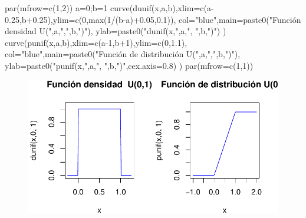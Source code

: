 \documentclass[
  letterpaper,
  DIV=11,
  numbers=noendperiod]{scrreprt}
\newenvironment{Shaded}{\begin{snugshade}}{\end{snugshade}}
\newcommand{\AttributeTok}[1]{\textcolor[rgb]{0.40,0.45,0.13}{#1}}
\newcommand{\DecValTok}[1]{\textcolor[rgb]{0.68,0.00,0.00}{#1}}
\newcommand{\FloatTok}[1]{\textcolor[rgb]{0.68,0.00,0.00}{#1}}
\newcommand{\FunctionTok}[1]{\textcolor[rgb]{0.28,0.35,0.67}{#1}}
\newcommand{\NormalTok}[1]{\textcolor[rgb]{0.00,0.23,0.31}{#1}}
\newcommand{\OtherTok}[1]{\textcolor[rgb]{0.00,0.23,0.31}{#1}}
\newcommand{\SpecialCharTok}[1]{\textcolor[rgb]{0.37,0.37,0.37}{#1}}
\newcommand{\StringTok}[1]{\textcolor[rgb]{0.13,0.47,0.30}{#1}}
\begin{document}
\begin{Shaded}
\begin{Highlighting}[]
\FunctionTok{par}\NormalTok{(}\AttributeTok{mfrow=}\FunctionTok{c}\NormalTok{(}\DecValTok{1}\NormalTok{,}\DecValTok{2}\NormalTok{))}
\NormalTok{a}\OtherTok{=}\DecValTok{0}\NormalTok{;b}\OtherTok{=}\DecValTok{1}
\FunctionTok{curve}\NormalTok{(}\FunctionTok{dunif}\NormalTok{(x,a,b),}\AttributeTok{xlim=}\FunctionTok{c}\NormalTok{(a}\FloatTok{{-}0.25}\NormalTok{,b}\FloatTok{+0.25}\NormalTok{),}\AttributeTok{ylim=}\FunctionTok{c}\NormalTok{(}\DecValTok{0}\NormalTok{,}\FunctionTok{max}\NormalTok{(}\DecValTok{1}\SpecialCharTok{/}\NormalTok{(b}\SpecialCharTok{{-}}\NormalTok{a)}\SpecialCharTok{+}\FloatTok{0.05}\NormalTok{,}\FloatTok{0.1}\NormalTok{)),}
      \AttributeTok{col=}\StringTok{"blue"}\NormalTok{,}\AttributeTok{main=}\FunctionTok{paste0}\NormalTok{(}\StringTok{"Función densidad  U("}\NormalTok{,a,}\StringTok{","}\NormalTok{,b,}\StringTok{")"}\NormalTok{),}
      \AttributeTok{ylab=}\FunctionTok{paste0}\NormalTok{(}\StringTok{"dunif(x,"}\NormalTok{,a,}\StringTok{", "}\NormalTok{,b,}\StringTok{")"}\NormalTok{)}
\NormalTok{      )}
\FunctionTok{curve}\NormalTok{(}\FunctionTok{punif}\NormalTok{(x,a,b),}\AttributeTok{xlim=}\FunctionTok{c}\NormalTok{(a}\DecValTok{{-}1}\NormalTok{,b}\SpecialCharTok{+}\DecValTok{1}\NormalTok{),}\AttributeTok{ylim=}\FunctionTok{c}\NormalTok{(}\DecValTok{0}\NormalTok{,}\FloatTok{1.1}\NormalTok{),}
      \AttributeTok{col=}\StringTok{"blue"}\NormalTok{,}\AttributeTok{main=}\FunctionTok{paste0}\NormalTok{(}\StringTok{"Función de distribución U("}\NormalTok{,a,}\StringTok{","}\NormalTok{,b,}\StringTok{")"}\NormalTok{),}
      \AttributeTok{ylab=}\FunctionTok{paste0}\NormalTok{(}\StringTok{"punif(x,"}\NormalTok{,a,}\StringTok{", "}\NormalTok{,b,}\StringTok{")"}\NormalTok{,}\AttributeTok{cex.axis=}\FloatTok{0.8}\NormalTok{)}
\NormalTok{      )}
\FunctionTok{par}\NormalTok{(}\AttributeTok{mfrow=}\FunctionTok{c}\NormalTok{(}\DecValTok{1}\NormalTok{,}\DecValTok{1}\NormalTok{))}
\end{Highlighting}
\end{Shaded}

\begin{figure}

{\centering \includegraphics{3_files/figure-pdf/grafica_unif10_vista-1.pdf}

}

\end{figure}
\end{document}
